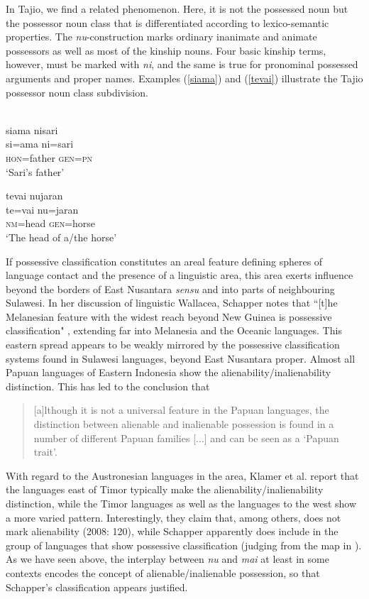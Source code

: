 In Tajio, we find a related phenomenon. Here, it is not the possessed noun but the possessor noun class that is differentiated according to lexico-semantic properties. The \textit{nu}-construction marks ordinary inanimate and animate possessors as well as most of the kinship nouns. Four basic kinship terms, however, must be marked with \textit{ni}, and the same is true for pronominal possessed arguments and proper names. Examples (\ref{siama}) and (\ref{tevai}) illustrate the Tajio possessor noun class subdivision.

\ea
{}\\
\ea \label{siama}
\glll siama nisari \\
si=ama ni=sari\\
\textsc{hon}=father \textsc{gen}=\textsc{pn}\\
\glt ‘Sari's father’
\ex \label{tevai}

\gll tevai nujaran \\
te=vai nu=jaran\\
\textsc{nm}=head \textsc{gen}=horse\\
\glt ‘The head of a/the horse’
\z
\z

If possessive classification constitutes an areal feature defining spheres of language contact and the presence of a linguistic area, this area exerts influence beyond the borders of East Nusantara \textit{sensu} \citet{klamer2008east} and into parts of neighbouring Sulawesi. In her discussion of linguistic Wallacea, Schapper notes that ``[t]he Melanesian feature with the widest reach beyond New Guinea is possessive classification" \citep[108]{schapper2015wallacea}, extending far into Melanesia and the Oceanic languages. This eastern spread appears to be weakly mirrored by the possessive classification systems found in Sulawesi languages, beyond East Nusantara proper. Almost all Papuan languages of Eastern Indonesia show the alienability/inalienability distinction. This has led \citet[120]{klamer2008east} to the conclusion that

\begin{quote}[a]lthough it is not a universal feature in the Papuan languages,
the distinction between alienable and inalienable possession is found in a number of different Papuan families [...] and can be seen as a `Papuan trait’.\end{quote}

With regard to the Austronesian languages in the area, Klamer et al. report that the languages east of Timor typically make the alienability/inalienability distinction, while the Timor languages as well as the languages to the west show a more varied pattern. Interestingly, they claim that, among others,  does not mark alienability (2008: 120), while Schapper apparently does include  in the group of languages that show possessive classification (judging from the map in \citealt[110]{schapper2009bunaq}). As we have seen above, the interplay between \textit{nu} and \textit{mai} at least in some contexts encodes the concept of alienable/inalienable possession, so that Schapper's classification appears justified.

